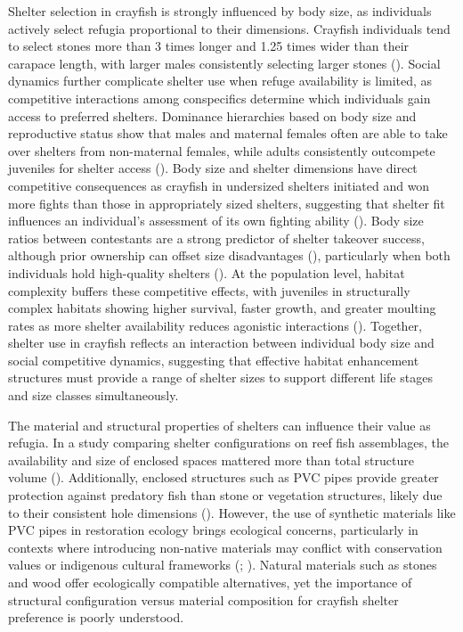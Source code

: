 \documentclass[
  letterpaper,
  DIV=11,
  numbers=noendperiod]{scrartcl}
\begin{document}
Shelter selection in crayfish is strongly influenced by body size, as
individuals actively select refugia proportional to their dimensions.
Crayfish individuals tend to select stones more than 3 times longer and
1.25 times wider than their carapace length, with larger males
consistently selecting larger stones
(). Social dynamics
further complicate shelter use when refuge availability is limited, as
competitive interactions among conspecifics determine which individuals
gain access to preferred shelters. Dominance hierarchies based on body
size and reproductive status show that males and maternal females often
are able to take over shelters from non-maternal females, while adults
consistently outcompete juveniles for shelter access
(). Body size and
shelter dimensions have direct competitive consequences as crayfish in
undersized shelters initiated and won more fights than those in
appropriately sized shelters, suggesting that shelter fit influences an
individual's assessment of its own fighting ability
(). Body size
ratios between contestants are a strong predictor of shelter takeover
success, although prior ownership can offset size disadvantages
(), particularly when
both individuals hold high-quality shelters
(). At the
population level, habitat complexity buffers these competitive effects,
with juveniles in structurally complex habitats showing higher survival,
faster growth, and greater moulting rates as more shelter availability
reduces agonistic interactions (). Together, shelter use in crayfish reflects an
interaction between individual body size and social competitive
dynamics, suggesting that effective habitat enhancement structures must
provide a range of shelter sizes to support different life stages and
size classes simultaneously.

The material and structural properties of shelters can influence their
value as refugia. In a study comparing shelter configurations on reef
fish assemblages, the availability and size of enclosed spaces mattered
more than total structure volume (). Additionally, enclosed structures such as PVC
pipes provide greater protection against predatory fish than stone or
vegetation structures, likely due to their consistent hole dimensions
(). However, the use of
synthetic materials like PVC pipes in restoration ecology brings
ecological concerns, particularly in contexts where introducing
non-native materials may conflict with conservation values or indigenous
cultural frameworks (;
). Natural materials
such as stones and wood offer ecologically compatible alternatives, yet
the importance of structural configuration versus material composition
for crayfish shelter preference is poorly understood.
\end{document}

